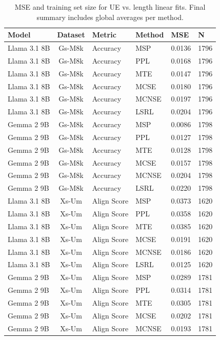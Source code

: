 \begin{table}
\footnotesize
\centering
\caption{MSE and training set size for UE vs. length linear fits. Final summary includes global averages per method.}
\begin{tabular}{lc}
\toprule
Model & Dataset & Metric & Method & MSE & N \\
\midrule
Llama 3.1 8B & Gs-M8k & Accuracy & MSP & 0.0136 & 1796 \\
Llama 3.1 8B & Gs-M8k & Accuracy & PPL & 0.0168 & 1796 \\
Llama 3.1 8B & Gs-M8k & Accuracy & MTE & 0.0147 & 1796 \\
Llama 3.1 8B & Gs-M8k & Accuracy & MCSE & 0.0180 & 1796 \\
Llama 3.1 8B & Gs-M8k & Accuracy & MCNSE & 0.0197 & 1796 \\
Llama 3.1 8B & Gs-M8k & Accuracy & LSRL & 0.0204 & 1796 \\
Gemma 2 9B & Gs-M8k & Accuracy & MSP & 0.0086 & 1798 \\
Gemma 2 9B & Gs-M8k & Accuracy & PPL & 0.0127 & 1798 \\
Gemma 2 9B & Gs-M8k & Accuracy & MTE & 0.0128 & 1798 \\
Gemma 2 9B & Gs-M8k & Accuracy & MCSE & 0.0157 & 1798 \\
Gemma 2 9B & Gs-M8k & Accuracy & MCNSE & 0.0204 & 1798 \\
Gemma 2 9B & Gs-M8k & Accuracy & LSRL & 0.0220 & 1798 \\
Llama 3.1 8B & Xs-Um & Align Score & MSP & 0.0373 & 1620 \\
Llama 3.1 8B & Xs-Um & Align Score & PPL & 0.0358 & 1620 \\
Llama 3.1 8B & Xs-Um & Align Score & MTE & 0.0385 & 1620 \\
Llama 3.1 8B & Xs-Um & Align Score & MCSE & 0.0191 & 1620 \\
Llama 3.1 8B & Xs-Um & Align Score & MCNSE & 0.0186 & 1620 \\
Llama 3.1 8B & Xs-Um & Align Score & LSRL & 0.0125 & 1620 \\
Gemma 2 9B & Xs-Um & Align Score & MSP & 0.0289 & 1781 \\
Gemma 2 9B & Xs-Um & Align Score & PPL & 0.0314 & 1781 \\
Gemma 2 9B & Xs-Um & Align Score & MTE & 0.0305 & 1781 \\
Gemma 2 9B & Xs-Um & Align Score & MCSE & 0.0202 & 1781 \\
Gemma 2 9B & Xs-Um & Align Score & MCNSE & 0.0193 & 1781 \\

\end{tabular}
\end{table}
